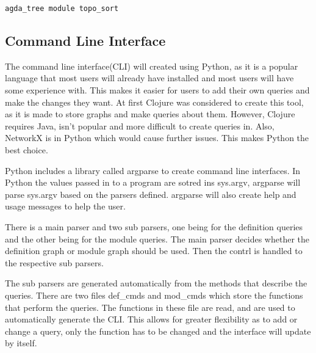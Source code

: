 \begin{lstlisting}
agda_tree module topo_sort
\end{lstlisting}


\subsection{Command Line Interface}\label{sub:Agda Tree CLI}

The command line interface(CLI) will created using Python, as it is a popular
language that most users will already have installed and most users will have
some experience with. This makes it easier for users to add their own queries
and make the changes they want. At first Clojure was considered to create this
tool, as it is made to store graphs and make queries about them. However,
Clojure requires Java, isn't popular and more difficult to create queries in.
Also, NetworkX is in Python which would cause further issues. This makes Python
the best choice.

Python includes a library called argparse to create command line interfaces. In
Python the values passed in to a program are sotred ins sys.argv, argparse will
parse sys.argv based on the parsers defined. argparse will also create help and
usage messages to help the user.

There is a main parser and two sub parsers, one being for the definition
queries and the other being for the module queries. The main parser decides
whether the definition graph or module graph should be used. Then the contrl is
handled to the respective sub parsers.

The sub parsers are generated automatically from the methods that describe the
queries. There are two files def\_cmds and mod\_cmds which store the functions
that perform the queries. The functions in these file are read, and are used to
automatically generate the CLI. This allows for greater flexibility as to add
or change a query, only the function has to be changed and the interface will
update by itself.

